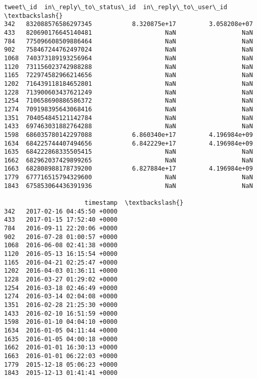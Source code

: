 \documentclass[11pt]{article}
\makeatletter
\newcommand{\boxspacing}{\kern\kvtcb@left@rule\kern\kvtcb@boxsep}
\newcommand{\prompt}[4]{
        {\ttfamily\llap{{\color{#2}[#3]:\hspace{3pt}#4}}\vspace{-\baselineskip}}
    }
\makeatother
\begin{document}
            \begin{tcolorbox}[breakable, size=fbox, boxrule=.5pt, pad at break*=1mm, opacityfill=0]
\prompt{Out}{outcolor}{19}{\boxspacing}
\begin{Verbatim}[commandchars=\\\{\}]
                tweet\_id  in\_reply\_to\_status\_id  in\_reply\_to\_user\_id  \textbackslash{}
342   832088576586297345           8.320875e+17         3.058208e+07
433   820690176645140481                    NaN                  NaN
784   775096608509886464                    NaN                  NaN
902   758467244762497024                    NaN                  NaN
1068  740373189193256964                    NaN                  NaN
1120  731156023742988288                    NaN                  NaN
1165  722974582966214656                    NaN                  NaN
1202  716439118184652801                    NaN                  NaN
1228  713900603437621249                    NaN                  NaN
1254  710658690886586372                    NaN                  NaN
1274  709198395643068416                    NaN                  NaN
1351  704054845121142784                    NaN                  NaN
1433  697463031882764288                    NaN                  NaN
1598  686035780142297088           6.860340e+17         4.196984e+09
1634  684225744407494656           6.842229e+17         4.196984e+09
1635  684222868335505415                    NaN                  NaN
1662  682962037429899265                    NaN                  NaN
1663  682808988178739200           6.827884e+17         4.196984e+09
1779  677716515794329600                    NaN                  NaN
1843  675853064436391936                    NaN                  NaN

                      timestamp  \textbackslash{}
342   2017-02-16 04:45:50 +0000
433   2017-01-15 17:52:40 +0000
784   2016-09-11 22:20:06 +0000
902   2016-07-28 01:00:57 +0000
1068  2016-06-08 02:41:38 +0000
1120  2016-05-13 16:15:54 +0000
1165  2016-04-21 02:25:47 +0000
1202  2016-04-03 01:36:11 +0000
1228  2016-03-27 01:29:02 +0000
1254  2016-03-18 02:46:49 +0000
1274  2016-03-14 02:04:08 +0000
1351  2016-02-28 21:25:30 +0000
1433  2016-02-10 16:51:59 +0000
1598  2016-01-10 04:04:10 +0000
1634  2016-01-05 04:11:44 +0000
1635  2016-01-05 04:00:18 +0000
1662  2016-01-01 16:30:13 +0000
1663  2016-01-01 06:22:03 +0000
1779  2015-12-18 05:06:23 +0000
1843  2015-12-13 01:41:41 +0000


\end{Verbatim}
\end{tcolorbox}
\end{document}
